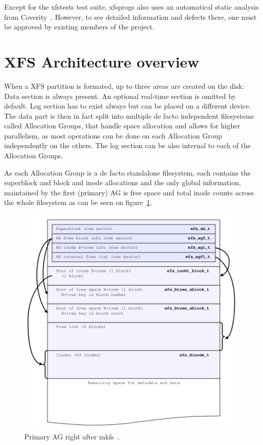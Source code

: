 Except for the xfstests test suite, xfsprogs also uses an automatical static analysis from Coverity~\cite{CoverityXfsprogs}. However, to see detailed information and defects there, one must be approved by existing members of the project.


\section{XFS Architecture overview}\label{chap:xfs:overview}

When a XFS partition is formated, up to three areas are created on the disk: Data section is always present. An optional real-time section is omitted by default. Log section has to exist always but can be placed on a different device. The data part is then in fact split into multiple de facto independent filesystems called Allocation Groups, that handle space allocation and allows for higher parallelism, as most operations can be done on each Allocation Group independently on the others. The log section can be also internal to each of the Allocation Groups.

As each Allocation Group is a de facto standalone filesystem, each contains
the superblock and block and inode allocations and the only global
information, maintained by the first (primary) AG is free space and total
inode counts across the whole filesystem as can be seen
on figure~\ref{fig:xfs:primaryAG}.

\begin{figure}
  \centering
 \includegraphics[width=13cm,keepaspectratio]{fig/primary-ag} %
 \caption{Primary AG right after mkfs~\cite[Ch. 3]{xfsStructure}.}
\label{fig:xfs:primaryAG}
\end{figure}
	
